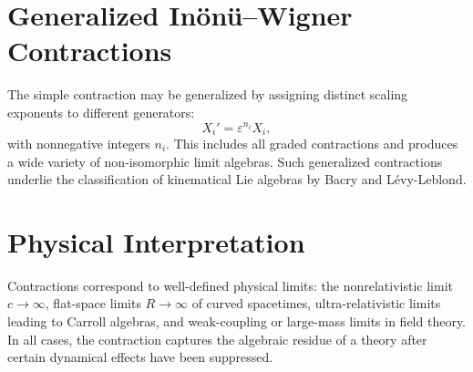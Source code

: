 \documentclass[11pt]{article}
\begin{document}
\section{Generalized In\"on\"u--Wigner Contractions}

The simple contraction may be generalized by assigning distinct scaling
exponents to different generators:
\begin{equation}
    X_i' = \varepsilon^{n_i} X_i ,
\end{equation}
with nonnegative integers $n_i$.  This includes all graded contractions and
produces a wide variety of non-isomorphic limit algebras.  Such generalized
contractions underlie the classification of kinematical Lie algebras by Bacry
and L\'evy-Leblond.

\section{Physical Interpretation}

Contractions correspond to well-defined physical limits: the
nonrelativistic limit $c\to\infty$, flat-space limits $R\to\infty$ of curved
spacetimes, ultra-relativistic limits leading to Carroll algebras, and
weak-coupling or large-mass limits in field theory.  In all cases, the
contraction captures the algebraic residue of a theory after certain dynamical
effects have been suppressed.
\end{document}
